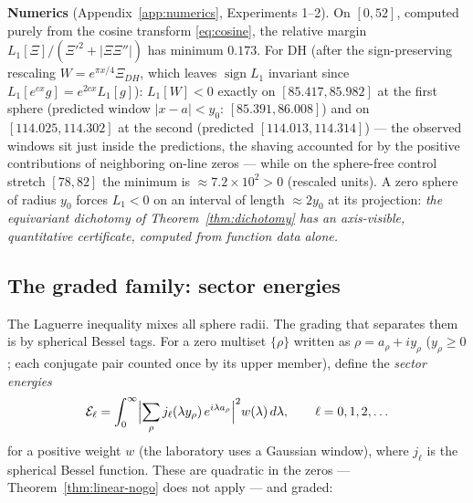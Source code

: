 \documentclass[11pt]{amsart}
\theoremstyle{plain}
\theoremstyle{definition}
\theoremstyle{remark}
\newcommand{\EE}{\mathcal{E}}
\newcommand{\dd}{\,d}
\begin{document}
\textbf{Numerics} (Appendix~\ref{app:numerics}, Experiments 1--2). On $[0,52]$, computed purely
from the cosine transform \eqref{eq:cosine}, the relative margin
$L_1[\Xi]/(\Xi'^2+|\Xi\Xi''|)$ has minimum $0.173$. For DH (after the sign-preserving rescaling
$W=e^{\pi x/4}\Xi_{DH}$, which leaves $\operatorname{sign}L_1$ invariant since
$L_1[e^{cx}g]=e^{2cx}L_1[g]$): $L_1[W]<0$ exactly on $[85.417,85.982]$ at the first sphere
(predicted window $|x-a|<y_0$: $[85.391,86.008]$) and on $[114.025,114.302]$ at the second
(predicted $[114.013,114.314]$) --- the observed windows sit just inside the predictions, the
shaving accounted for by the positive contributions of neighboring on-line zeros --- while on the
sphere-free control stretch $[78,82]$ the minimum is $\approx7.2\times10^2>0$ (rescaled units).
A zero sphere of radius $y_0$ forces $L_1<0$ on an interval of length $\approx2y_0$ at its
projection: \emph{the equivariant dichotomy of Theorem~\ref{thm:dichotomy} has an axis-visible,
quantitative certificate, computed from function data alone.}

\subsection{The graded family: sector energies}\label{subsec:sectors-energies}

The Laguerre inequality mixes all sphere radii. The grading that separates them is by spherical
Bessel tags. For a zero multiset $\{\rho\}$ written as $\rho=a_\rho+iy_\rho$ ($y_\rho\ge0$; each
conjugate pair counted once by its upper member), define the \emph{sector energies}
\begin{equation}\label{eq:sector}
\EE_\ell=\int_0^\infty\Bigl|\sum_\rho j_\ell(\lambda y_\rho)\,e^{i\lambda a_\rho}\Bigr|^2
w(\lambda)\dd\lambda,\qquad \ell=0,1,2,\ldots
\end{equation}
for a positive weight $w$ (the laboratory uses a Gaussian window), where $j_\ell$ is the
spherical Bessel function. These are quadratic in the zeros --- Theorem~\ref{thm:linear-nogo}
does not apply --- and graded:
\end{document}
